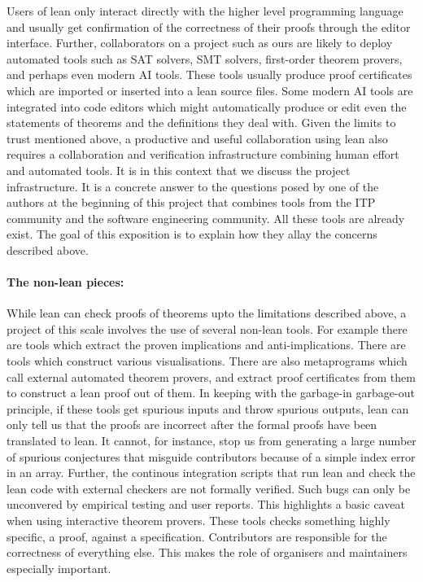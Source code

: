 Users of lean only interact directly with the higher level programming language and usually get confirmation of the correctness of their proofs through the editor interface. Further, collaborators on a project such as ours are likely to deploy automated tools such as SAT solvers, SMT solvers, first-order theorem provers, and perhaps even modern AI tools. These tools usually produce proof certificates which are imported or inserted into a lean source files. Some modern AI tools are integrated into code editors which might automatically produce or edit even the statements of theorems and the definitions they deal with. Given the limits to trust mentioned above, a productive and useful collaboration using lean also requires a collaboration and verification infrastructure combining human effort and automated tools. It is in this context that we discuss the project infrastructure. It is a concrete answer to the questions posed by one of the authors at the beginning of this project \cite{Tao_blog_Sep_2024} that combines tools from the ITP community and the software engineering community. All these tools are already exist. The goal of this exposition is to explain how they allay the concerns described above.


\paragraph{\textbf{The non-lean pieces:}} While lean can check proofs of theorems upto the limitations described above, a project of this scale involves the use of several non-lean tools. For example there are tools which extract the proven implications and anti-implications. There are tools which construct various visualisations. There are also metaprograms which call external automated theorem provers, and extract proof certificates from them to construct a lean proof out of them. In keeping with the garbage-in garbage-out principle, if these tools get spurious inputs and throw spurious outputs, lean can only tell us that the proofs are incorrect after the formal proofs have been translated to lean. It cannot, for instance, stop us from generating a large number of spurious conjectures that misguide contributors because of a simple index error in an array. Further, the continous integration scripts that run lean and check the lean code with external checkers are not formally verified. Such bugs can only be unconvered by empirical testing and user reports. This highlights a basic caveat when using interactive theorem provers. These tools checks something highly specific, a proof, against a specification. Contributors are responsible for the correctness of everything else. This makes the role of organisers and maintainers especially important.

